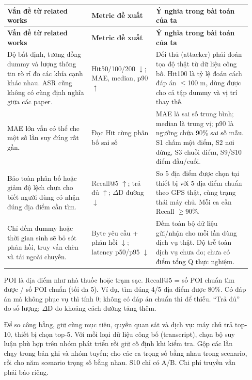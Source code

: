 \documentclass[10pt,a4paper]{article}
\begin{document}
\begingroup\small
\begin{longtable}{@{}P{5.513cm}P{4.135cm}P{6.990cm}@{}}
\toprule
\textbf{Vấn đề từ related works} & \textbf{Metric đề xuất} & \textbf{Ý nghĩa trong bài toán của ta}\\\midrule
\endfirsthead
\toprule
\textbf{Vấn đề từ related works} & \textbf{Metric đề xuất} & \textbf{Ý nghĩa trong bài toán của ta}\\\midrule
\endhead
\bottomrule\endfoot
Độ bất định, tương đồng dummy và lượng thông tin rò rỉ đo các khía cạnh khác nhau. ASR cũng không có cùng định nghĩa giữa các paper. & Hit50/100/200 $\downarrow$; MAE, median, p90 $\uparrow$ & Đối thủ (attacker) phải đoán tọa độ thật từ dữ liệu công bố. Hit100 là tỷ lệ đoán cách đáp án $\le$100 m, dùng được cho cả tập dummy và vị trí thay thế.\\
\addlinespace[3pt]
MAE lớn vẫn có thể che một số lần suy đúng rất gần. & Đọc Hit cùng phân bố sai số & MAE là sai số trung bình; median là trung vị; p90 là ngưỡng chứa 90\% sai số mẫu. S1 chấm một điểm, S2 nơi dừng, S3 chuỗi điểm, S9/S10 điểm đầu/cuối.\\
\addlinespace[3pt]
Bảo toàn phân bố hoặc giảm độ lệch chưa cho biết người dùng có nhận đúng địa điểm cần tìm. & Recall@5 $\uparrow$; trả đủ $\uparrow$; $\Delta$D đường $\downarrow$ & So 5 địa điểm được chọn tại thiết bị với 5 địa điểm chuẩn theo GPS thật, cùng trạng thái máy chủ. Mỗi ca cần Recall $\ge$90\%.\\
\addlinespace[3pt]
Chỉ đếm dummy hoặc thời gian sinh sẽ bỏ sót phản hồi, truy vấn chèn và tải ngoài chuyến. & Byte yêu cầu + phản hồi $\downarrow$; latency p50/p95 $\downarrow$ & Đếm toàn bộ dữ liệu gửi/nhận cho mỗi lần dùng dịch vụ thật. Độ trễ toàn dịch vụ chưa đo; chưa có điểm tổng Q thực nghiệm.\\
\end{longtable}
\endgroup
POI là địa điểm như nhà thuốc hoặc trạm sạc. Recall@5 = số POI chuẩn tìm được / số POI chuẩn (tối đa 5). Ví dụ, tìm đúng 4/5 địa điểm được 80\%. Có đáp án mà không phục vụ thì tính 0; không có đáp án chuẩn thì để thiếu. “Trả đủ” đo số lượng; $\Delta$D đo khoảng cách đường tăng thêm.

Để so công bằng, giữ cùng mục tiêu, quyền quan sát và dịch vụ: máy chủ trả top-10, thiết bị chọn top-5. Với mỗi loại dữ liệu công bố (transcript), chọn bộ suy luận phù hợp trên nhóm phát triển rồi giữ cố định khi kiểm tra. Gộp các lần chạy trong bản ghi và nhóm tuyến; cho các ca trọng số bằng nhau trong scenario, rồi cho năm scenario trọng số bằng nhau. S10 chỉ có A/B. Chi phí truyền vẫn phải báo riêng.
\end{document}
